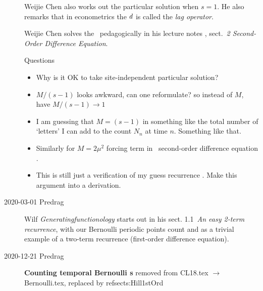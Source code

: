 \begin{description}
Weijie Chen also works out the particular solution when $s=1$.
                                    \toCB
He also remarks that in econometrics the {\shiftOp} $d$ is called
the \emph{lag operator}.

Weijie Chen solves the \templatt\ pedagogically in his lecture notes
, sect.~{\em 2 Second-Order Difference Equation}.

Questions
\begin{itemize}
  \item
Why is it OK to take site-independent particular solution?
  \item
${{M}}/(s-1)$ looks awkward, can one reformulate? so instead of $M$, have
${{M}}/(s-1)\to1$
  \item
I am guessing that $M=(s-1)$ in 
something like the total number of `letters' I can add to
the count $N_n$ at time $n$. Something like that.
  \item
Similarly for $M=2{\mu}^2$ forcing term in \templatt\ second-order
difference equation .
  \item
This is still just a verification of my guess recurrence
.
Make this argument into a derivation.
\end{itemize}


\item[2020-03-01 Predrag]
Wilf {\em Generatingfunctionology} starts out in his sect.
1.1~{\em An easy 2-term recurrence}, with our Bernoulli periodic points
count  and
 as a trivial example of a two-term
recurrence (first-order difference equation).

\item[2020-12-21 Predrag]
{\bf Counting {temporal Bernoulli} {\lattstate}s}
removed from CL18.tex $\to$ Bernoulli.tex, replaced by  refsect{s:Hill1stOrd}
\bigskip


\end{description}
